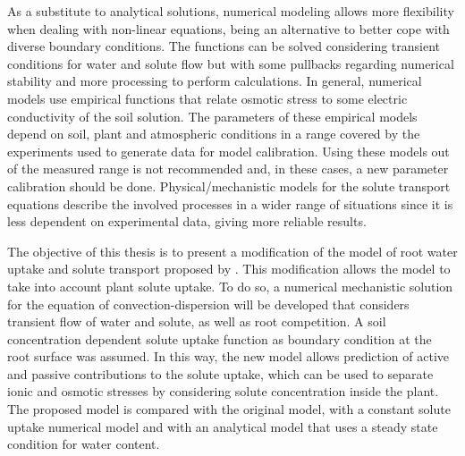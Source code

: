As a substitute to analytical solutions, numerical modeling allows more flexibility when dealing with non-linear equations, being an alternative to better cope with diverse boundary conditions. 
The functions can be solved considering transient conditions for water and solute flow but with some pullbacks regarding numerical stability and more processing to perform calculations.
In general, numerical models use empirical functions that relate osmotic stress to some electric conductivity of the soil solution. 
The parameters of these empirical models depend on soil, plant and atmospheric conditions in a range covered by the experiments used to generate data for model calibration. 
Using these models out of the measured range is not recommended and, in these cases, a new parameter calibration should be done.
Physical/mechanistic models for the solute transport equations describe the involved processes in a wider range of situations since it is less dependent on experimental data, giving more reliable results.


The objective of this thesis is to present a modification of the model of root water uptake and solute transport proposed by \citeonline[liersolute].
This modification allows the model to take into account plant solute uptake.
To do so, a numerical mechanistic solution for the equation of convection-dispersion will be developed that considers transient flow of water and solute, as well as root competition.
A soil concentration dependent solute uptake function as boundary condition at the root surface was assumed.
In this way, the new model allows prediction of active and passive contributions to the solute uptake, which can be used to separate ionic and osmotic stresses by considering solute concentration inside the plant. 
The proposed model is compared with the original model, with a constant solute uptake numerical model and with an analytical model that uses a steady state condition for water content. 
